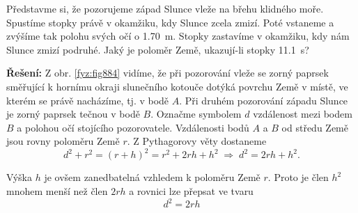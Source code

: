 \begin{mdframed}[style=mdexam]
  \begin{example}\label{fyz:fey_exam014}
    Představme si, že pozorujeme západ Slunce vleže na břehu klidného moře. Spustíme stopky právě v
    okamžiku, kdy Slunce zcela zmizí. Poté vstaneme a zvýšíme tak polohu svých očí o \SI{1.70}{\m}.
    Stopky zastavíme v okamžiku, kdy nám Slunce zmizí podruhé. Jaký je poloměr Země, ukazují-li
    stopky \SI{11.1}{\s}?\newline

    {\centering\captionsetup{type=figure}\par}

    \vspace{1em}
    \textbf{Řešení:} 
    Z obr. \ref{fyz:fig884} vidíme, že při pozorování vleže se zorný paprsek směřující k hornímu
    okraji slunečního kotouče dotýká povrchu Země v místě, ve kterém se právě nacházíme, tj. v bodě
    \(A\). Při druhém pozorování západu Slunce je zorný paprsek tečnou v bodě \(B\). Označme
    symbolem \(d\) vzdálenost mezi bodem \(B\) a polohou očí stojícího pozorovatele. Vzdálenosti
    bodů \(A\) a \(B\) od středu Země jsou rovny poloměru Země \(r\). Z Pythagorovy věty dostaneme
    \begin{equation*}
      d^2 + r^2 = (r + h)^2 = r^2 + 2rh + h^2\;\Rightarrow\; d^2 = 2rh + h^2.
    \end{equation*}

    Výška \(h\) je ovšem zanedbatelná vzhledem k poloměru Země \(r\). Proto je člen \(h^2\) mnohem
    menší než člen \(2rh\) a rovnici lze přepsat ve tvaru
    \begin{equation}\label{fyz:eq573}
      d^2 = 2rh
    \end{equation}


\end{example}
\end{mdframed}
